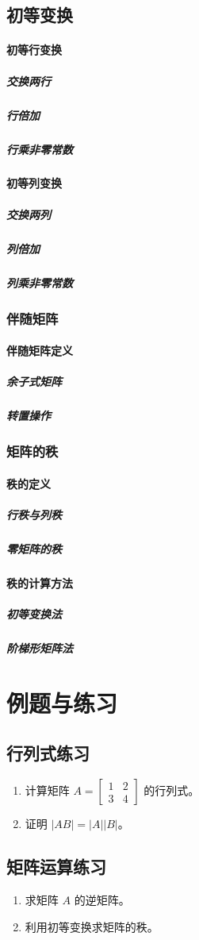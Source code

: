 \documentclass[a4paper,12pt]{article}
\begin{document}
    \subsection{初等变换}
    \paragraph{初等行变换}
    \subparagraph{交换两行}
    \subparagraph{行倍加}
    \subparagraph{行乘非零常数}

    \paragraph{初等列变换}
    \subparagraph{交换两列}
    \subparagraph{列倍加}
    \subparagraph{列乘非零常数}

    \subsubsection{伴随矩阵}
    \paragraph{伴随矩阵定义}
    \subparagraph{余子式矩阵}
    \subparagraph{转置操作}

    \subsubsection{矩阵的秩}
    \paragraph{秩的定义}
    \subparagraph{行秩与列秩}
    \subparagraph{零矩阵的秩}
    \paragraph{秩的计算方法}
    \subparagraph{初等变换法}
    \subparagraph{阶梯形矩阵法}

    \section{例题与练习}
    \subsection{行列式练习}
    \begin{enumerate}
        \item 计算矩阵 $A = \begin{bmatrix} 1 & 2 \\ 3 & 4 \end{bmatrix}$ 的行列式。
        \item 证明 $|AB| = |A||B|$。
    \end{enumerate}

    \subsection{矩阵运算练习}
    \begin{enumerate}
        \item 求矩阵 $A$ 的逆矩阵。
        \item 利用初等变换求矩阵的秩。
    \end{enumerate}
\end{document}
